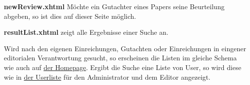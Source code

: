 \begin{samepage}
    \textbf{newReview.xhtml} Möchte ein Gutachter eines Papers seine Beurteilung abgeben, so ist dies auf dieser Seite möglich.
    \nopagebreak

\end{samepage}


\begin{samepage}
    \textbf{resultList.xhtml} zeigt alle Ergebnisse einer Suche an.
    \nopagebreak

    Wird nach den eigenen Einreichungen, Gutachten oder Einreichungen in eingener editorialen Verantwortung gesucht, so erscheinen die Listen im gleiche Schema wie auch auf \hyperref[flt:homepage]{der Homepage}.
    Ergibt die Suche eine Liste von User, so wird diese wie in \hyperref[flt:userList]{der Userliste} für den Administrator und dem Editor angezeigt.
    \nopagebreak

    \ftable{

    }
\end{samepage}


